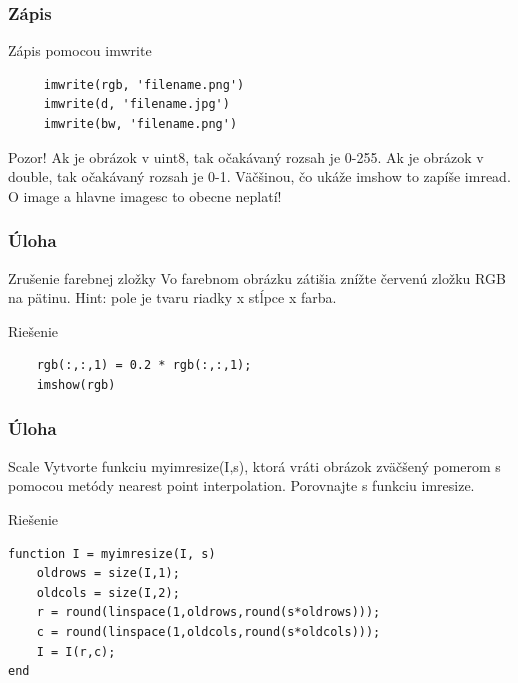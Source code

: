 \documentclass{beamer}
\begin{document}
\begin{frame}[fragile]
\frametitle{Zápis} 
  \begin{block}{Zápis pomocou imwrite}
  \begin{verbatim}
     imwrite(rgb, 'filename.png')
     imwrite(d, 'filename.jpg')
     imwrite(bw, 'filename.png')   \end{verbatim}  
  \end{block}
  
  \begin{alertblock}{Pozor!}
  Ak je obrázok v uint8, tak očakávaný rozsah je 0-255. Ak je obrázok v double, tak očakávaný rozsah je 0-1. Väčšinou, čo ukáže imshow to zapíše imread. O image a hlavne imagesc to obecne neplatí! 
  \end{alertblock}
\end{frame}

\begin{frame}[fragile]
\frametitle{Úloha} 
  \begin{block}{Zrušenie farebnej zložky}
    Vo farebnom obrázku zátišia znížte červenú zložku RGB na pätinu. Hint: pole je tvaru riadky x stĺpce x farba.
  \end{block}
  
  \pause
  
  \begin{block}{Riešenie}
  \begin{verbatim}
    rgb(:,:,1) = 0.2 * rgb(:,:,1); 
    imshow(rgb)   \end{verbatim}  
  \end{block}
\end{frame}

\begin{frame}[fragile]
\frametitle{Úloha} 
  \begin{block}{Scale}
    Vytvorte funkciu myimresize(I,s), ktorá vráti obrázok zväčšený pomerom s pomocou metódy nearest point interpolation. Porovnajte s funkciu imresize.
  \end{block}
  
  \pause
  
  \begin{block}{Riešenie}
  \begin{verbatim}
function I = myimresize(I, s)
    oldrows = size(I,1);
    oldcols = size(I,2);
    r = round(linspace(1,oldrows,round(s*oldrows)));
    c = round(linspace(1,oldcols,round(s*oldcols)));
    I = I(r,c);        
end  \end{verbatim}  
  \end{block}
\end{frame}
\end{document}

